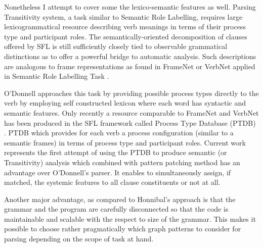 Nonetheless I attempt to cover some the lexico-semantic features as well. Parsing Transitivity system, a task similar to Semantic Role Labelling, requires large lexicogrammatical resource describing verb meanings in terms of their process type and participant roles. The semantically-oriented decomposition of clauses offered by SFL is still sufficiently closely tied to observable grammatical distinctions as to offer a powerful bridge to automatic analysis. Such descriptions are analogous to frame representations \citep{Fillmore1985} as found in FrameNet \citep{Baker1998} or VerbNet \citep{Kipper2008} applied in Semantic Role Labelling Task \citep{Carreras2005}.

O'Donnell approaches this task by providing possible process types directly to the verb by employing self constructed lexicon where each word has syntactic and semantic features. Only recently a resource comparable to FrameNet and VerbNet has been produced in the SFL framework called Process Type Database (PTDB) \citep{Neale2002}. PTDB which provides for each verb a process configuration (similar to a semantic frames) in terms of process type and participant roles. Current work represents the first attempt of using the PTDB to produce semantic (or Transitivity) analysis which combined with pattern patching method has an advantage over O'Donnell's parser. It enables to simultaneously assign, if matched, the systemic features to all clause constituents or not at all.

Another major advantage, as compared to Honnibal's approach is that the grammar and the program are carefully disconnected so that the code is maintainable and scalable with the respect to size of the grammar. This makes it possible to choose rather pragmatically which graph patterns to consider for parsing depending on the scope of task at hand.

